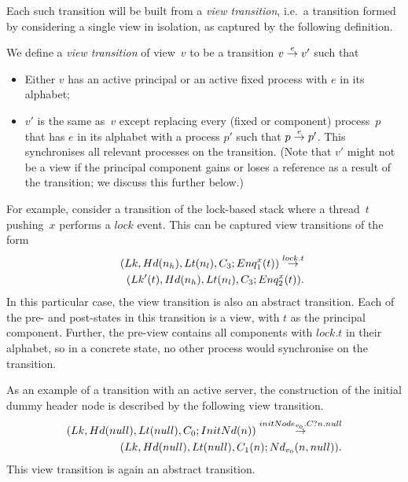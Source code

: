 
%
Each such transition will be built from a \emph{view transition}, i.e.~a
transition formed by considering a single view in isolation, as captured by
the following definition.
%
\begin{definition}
We define a \emph{view transition} of view~$v$ to be a transition $v \stackrel{e}\rightarrow
v'$ such that
%
\begin{itemize}
\item Either $v$ has an active principal or an active fixed process with $e$
  in its alphabet;

\item $v'$ is the same as~$v$ except replacing every (fixed or component)
  process~$p$ that has $e$ in its alphabet with a process $p'$ such that \( p
  \stackrel{e}\rightarrow p' \).  This synchronises all relevant processes on the
  transition. (Note that $v'$ might not be a view if the principal component
  gains or loses a reference as a result of the transition; we discuss this
  further below.)
\end{itemize}
\end{definition}


For example, consider a transition of the lock-based stack where a thread~$t$
pushing~$x$ performs a $lock$ event.  This can be captured view transitions of
the form
%
\begin{equation}
\begin{align}
(Lk, Hd(n_h), Lt(n_l), C_3; Enq^x_1(t))  \stackrel{lock.t}\rightarrow \\
\qquad  (Lk'(t), Hd(n_h), Lt(n_l), C_3; Enq^x_2(t)) .
\end{align}
\label{trans:lock}
\end{equation}
%
%
In this particular case, the view transition is also an abstract transition.
Each of the pre- and post-states in this transition is a view, with $t$ as the
principal component.  Further, the pre-view contains all components with
$lock.t$ in their alphabet, so in a concrete state, no other process would
synchronise on the transition.

As an example of a transition with an active server, the construction of the
initial dummy header node is described by the following view transition.
\[
\begin{align}
(Lk, Hd(null), Lt(null), C_0; InitNd(n)) 
  \stackrel{initNode_{v_0}.C?n.null}\rightarrow \\
\qquad (Lk, Hd(null), Lt(null), C_1(n); Nd_{v_0}(n, null)).
\end{align}
\]
This view transition is again an abstract transition. 

